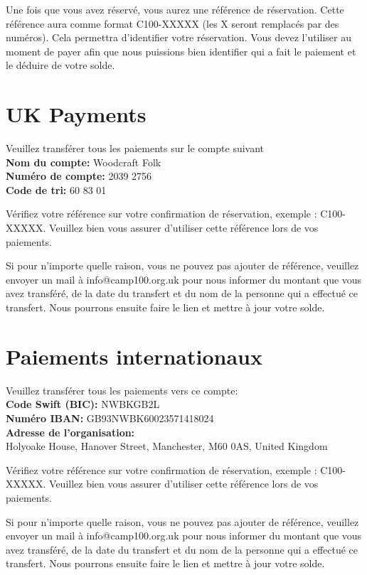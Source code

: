 \documentclass[a4paper, 11pt]{report}
\begin{document}
Une fois que vous avez r\'eserv\'e, vous aurez une r\'ef\'erence de r\'eservation. Cette r\'ef\'erence aura comme format C100-XXXXX (les X seront remplac\'es par des num\'eros).
Cela permettra d'identifier votre r\'eservation. Vous devez l'utiliser au moment de payer afin que nous puissions bien identifier qui a fait le paiement et le d\'eduire de votre solde. 

\section{UK Payments}

Veuillez transf\'erer tous les paiements sur le compte suivant\\
\textbf{Nom du compte:} Woodcraft Folk\\
\textbf{Num\'ero de compte:} 2039 2756\\
\textbf{Code de tri:} 60 83 01

V\'erifiez votre r\'ef\'erence sur votre confirmation de r\'eservation, exemple : C100-XXXXX. Veuillez bien vous assurer d'utiliser cette r\'ef\'erence lors de vos paiements.

Si pour n'importe quelle raison, vous ne pouvez pas ajouter de r\'ef\'erence, veuillez envoyer un mail \`a info@camp100.org.uk pour nous informer du montant que vous avez transf\'er\'e, de la date du transfert et du nom de la personne qui a effectu\'e ce transfert. Nous pourrons ensuite faire le lien et mettre \`a jour votre solde.

\section{Paiements internationaux}

Veuillez transf\'erer tous les paiements vers ce compte:\\
\textbf{Code Swift (BIC):} NWBKGB2L\\
\textbf{Num\'ero IBAN:} GB93NWBK60023571418024\\
\textbf{Adresse de l'organisation:} \\
Holyoake House, Hanover Street, Manchester, M60 0AS, United Kingdom

V\'erifiez votre r\'ef\'erence sur votre confirmation de r\'eservation, exemple : C100-XXXXX. Veuillez bien vous assurer d'utiliser cette r\'ef\'erence lors de vos paiements.

Si pour n'importe quelle raison, vous ne pouvez pas ajouter de r\'ef\'erence, veuillez envoyer un mail \`a info@camp100.org.uk pour nous informer du montant que vous avez transf\'er\'e, de la date du transfert et du nom de la personne qui a effectu\'e ce transfert. Nous pourrons ensuite faire le lien et mettre \`a jour votre solde.
\end{document}

